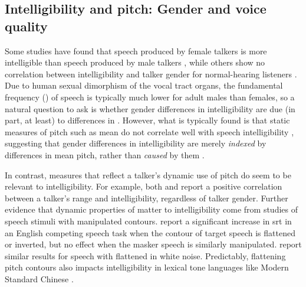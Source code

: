 \subsection[Intelligibility and pitch]{Intelligibility and pitch: Gender and voice quality\label{sec:IntelPitch}}
Some studies have found that speech produced by female talkers is more intelligible than speech produced by male talkers \citep{BradlowEtAl1996, HazanMarkham2004}, while others show no correlation between intelligibility and talker gender for normal-hearing listeners \citep{KilicOgut2004, Neel2008}.  Due to human sexual dimorphism of the vocal tract organs, the fundamental frequency (\fo) of speech is typically much lower for adult males than females, so a natural question to ask is whether gender differences in intelligibility are due (in part, at least) to differences in \fo.  However, what is typically found is that static measures of pitch such as mean \fo{} do not correlate well with speech intelligibility \citep[\eg,][]{PichenyEtAl1986, BradlowEtAl1996, HazanMarkham2004, LuCooke2009}, suggesting that gender differences in intelligibility are merely {\em indexed} by differences in mean pitch, rather than {\em caused} by them \citep[cf. discussion in][]{BradlowEtAl1996}.

In contrast, measures that reflect a talker’s dynamic use of pitch do seem to be relevant to intelligibility.  For example, both \citet{BradlowEtAl1996} and \citet{McCloyEtAl2013} report a positive correlation between a talker’s \fo{} range and intelligibility, regardless of talker gender.  %
Further evidence that dynamic properties of \fo{} matter to intelligibility come from studies of speech stimuli with manipulated \fo{} contours.  \citet{BinnsCulling2007} report a significant increase in \ac{srt} in an English competing speech task when the \fo{} contour of target speech is flattened or inverted, but no effect when the masker speech is similarly manipulated.  \citet{WatsonSchlauch2008} report similar results for speech with flattened \fo{} in white noise.  Predictably, flattening pitch contours also impacts intelligibility in lexical tone languages like Modern Standard Chinese \citep{PatelEtAl2010}.  

